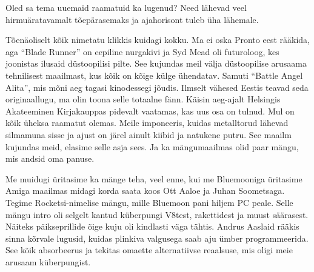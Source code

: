 
Oled sa tema uuemaid raamatuid ka lugenud? Need lähevad veel hirmuäratavamalt 
tõepärasemaks ja ajahorisont tuleb üha lähemale.


Tõenäoliselt kõik nimetatu klikkis kuidagi kokku. Ma ei oska 
Pronto eest rääkida, aga \enquote{Blade 
Runner} on eepiline nurgakivi ja Syd Mead oli futuroloog, kes 
joonistas ilusaid düstoopilisi pilte. See kujundas meil välja düstoopilise 
arusaama tehnilisest maailmast, kus kõik on kõige külge ühendatav. Samuti
\enquote{Battle Angel Alita}, mis mõni 
aeg tagasi kinodessegi jõudis. Ilmselt vähesed Eestis 
teavad seda originaallugu, ma olin toona selle totaalne fänn. Käisin 
aeg-ajalt Helsingis Akateeminen Kirjakauppas pidevalt vaatamas, kas uus osa on tulnud. Mul on kõik 
üheksa 
raamatut olemas. Meile imponeeris, kuidas metalltorud lähevad silmamuna sisse 
ja ajust on järel ainult kiibid ja natukene putru. See maailm kujundas meid, 
elasime selle asja sees. Ja ka mängumaailmas olid paar mängu, mis andsid oma 
panuse. 

Me muidugi üritasime ka mänge teha, veel enne, kui me 
Bluemooniga  üritasime Amiga maailmas midagi korda saata koos Ott 
Aaloe ja Juhan Soometsaga. 
Tegime Rocketsi-nimelise mängu, mille 
Bluemoon pani hiljem PC peale. 
Selle mängu intro oli selgelt kantud küberpungi V8test, rakettidest ja muust 
säärasest. Näiteks päikseprillide õige kuju oli kindlasti väga tähtis. Andrus 
Aaslaid 
rääkis sinna kõrvale lugusid, kuidas plinkiva valgusega saab 
aju ümber programmeerida. See kõik absorbeerus ja tekitas 
omaette alternatiivse reaalsuse, mis oligi meie arusaam 
küberpungist. 

